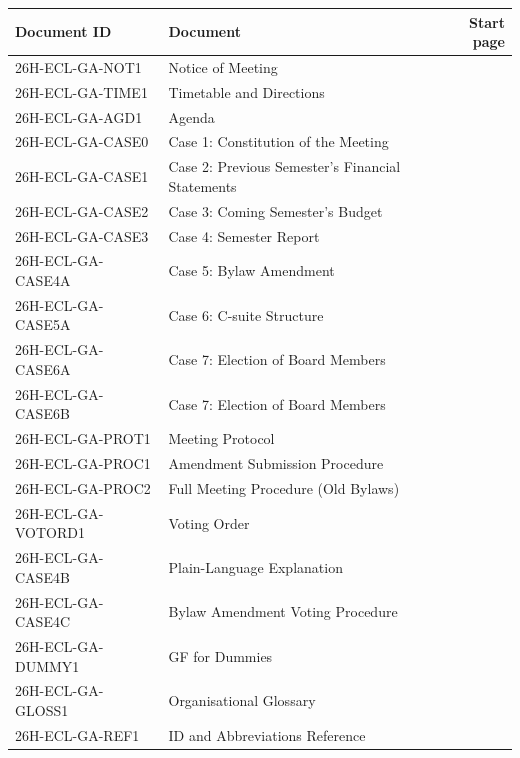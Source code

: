 \documentclass{../../../Common/Latex/Templates/rapport}
\begin{document}
\small
\renewcommand{\arraystretch}{1.12}
\begin{tabularx}{\textwidth}{@{}>{\ttfamily}l@{\quad}X@{\quad}r@{}}
    \textnormal{Document ID} & \textnormal{Document}                            & \textnormal{Start page} \\
    \hline
    26H-ECL-GA-NOT1          & Notice of Meeting                                & \pageref{doc:not1}      \\
    26H-ECL-GA-TIME1         & Timetable and Directions                         & \pageref{doc:time1}     \\
    26H-ECL-GA-AGD1          & Agenda                                           & \pageref{doc:agd1}      \\
    26H-ECL-GA-CASE0         & Case 1: Constitution of the Meeting              & \pageref{doc:case0}     \\
    26H-ECL-GA-CASE1         & Case 2: Previous Semester's Financial Statements & \pageref{doc:case1}     \\
    26H-ECL-GA-CASE2         & Case 3: Coming Semester's Budget                 & \pageref{doc:case2}     \\
    26H-ECL-GA-CASE3         & Case 4: Semester Report                          & \pageref{doc:case3}     \\
    26H-ECL-GA-CASE4A        & Case 5: Bylaw Amendment                          & \pageref{doc:case4a}    \\
    26H-ECL-GA-CASE5A        & Case 6: C-suite Structure                        & \pageref{doc:case5a}    \\
    26H-ECL-GA-CASE6A        & Case 7: Election of Board Members                & \pageref{doc:case6a}    \\
    26H-ECL-GA-CASE6B        & Case 7: Election of Board Members                & \pageref{doc:case6b}    \\
    26H-ECL-GA-PROT1         & Meeting Protocol                                 & \pageref{doc:prot1}     \\
    26H-ECL-GA-PROC1         & Amendment Submission Procedure                   & \pageref{doc:proc1}     \\
    26H-ECL-GA-PROC2         & Full Meeting Procedure (Old Bylaws)              & \pageref{doc:proc2}     \\
    26H-ECL-GA-VOTORD1       & Voting Order                                     & \pageref{doc:votord1}   \\
    26H-ECL-GA-CASE4B        & Plain-Language Explanation                       & \pageref{doc:case4b}    \\
    26H-ECL-GA-CASE4C        & Bylaw Amendment Voting Procedure                 & \pageref{doc:case4c}    \\
    26H-ECL-GA-DUMMY1        & GF for Dummies                                   & \pageref{doc:dummy1}    \\
    26H-ECL-GA-GLOSS1        & Organisational Glossary                          & \pageref{doc:gloss1}    \\
    26H-ECL-GA-REF1          & ID and Abbreviations Reference                   & \pageref{doc:ref1}      \\
\end{tabularx}
\normalsize
\end{document}
